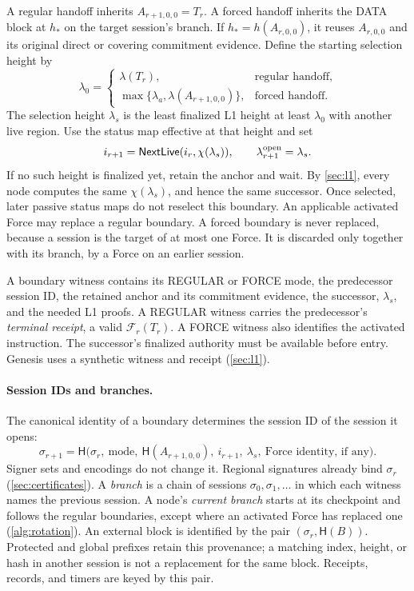 \documentclass[11pt,a4paper]{article}
\newif\ifrevmarks
\newcommand{\Rv}[1]{\ifrevmarks\leavevmode{\color{rvBlue}#1}\else#1\fi}
\newcommand{\Cid}[1]{\ifrevmarks\textsuperscript{\hyperlink{chg:#1}{\color{rvBlue}\sffamily\scriptsize#1}}\fi}
\newcommand{\FC}{\mathcal F}
\newcommand{\Hash}{\mathsf H}
\newcommand{\tagg}[1]{\ensuremath{\mathsf{#1}}}
\begin{document}
A regular handoff inherits $A_{r+1,0,0}=T_r$. A forced handoff inherits
the DATA block at $h_*$ on the target session's branch. If
$h_*=h(A_{r,0,0})$, it reuses $A_{r,0,0}$ and its original direct or covering commitment
evidence.
Define the starting selection height by
\[
 \lambda_0=\begin{cases}
 \lambda(T_r),&\text{regular handoff},\\
 \max\{\lambda_a,\lambda(A_{r+1,0,0})\},&\text{forced handoff}.
 \end{cases}
\]
The selection height $\lambda_s$ is the least finalized L1 height at
least $\lambda_0$ with another live region. Use the status map effective
at that height and set
\[
 i_{r+1}=\tagg{NextLive}(i_r,\chi(\lambda_s)),\qquad
 \lambda^{\rm open}_{r+1}=\lambda_s.
\]
If no such height is finalized yet, retain the anchor and wait.
\Rv{By \cref{sec:l1}, every node computes the same
$\chi(\lambda_s)$, and hence the same successor.} Once
selected, later passive status maps do not reselect this boundary.
An applicable activated Force may replace a regular boundary.
\Rv{A forced boundary is never replaced, because a session is
the target of at most one Force. It is discarded only together with its
branch, by a Force on an earlier session.}

A boundary witness contains its REGULAR or FORCE mode, the predecessor
\Rv{session ID}, the retained anchor and its commitment evidence, the successor,
$\lambda_s$, and the needed L1 proofs. \Rv{A REGULAR witness
carries the predecessor's \emph{terminal receipt}, a valid
$\FC_r(T_r)$.} A FORCE witness also identifies
the activated instruction. The successor's finalized authority must be
available before entry. Genesis uses a synthetic witness and receipt
\Rv{(\cref{sec:l1})}.

\paragraph{\Rv{Session IDs and branches.}}
\Rv{The canonical identity of a boundary determines the session
ID of the session it opens:}
\[
 \Rv{\sigma_{r+1}=\Hash\bigl(\sigma_r,\ \text{mode},\ \Hash(A_{r+1,0,0}),\
 i_{r+1},\ \lambda_s,\ \text{Force identity, if any}\bigr).}
\]
Signer sets and encodings do not change it. Regional signatures already
bind \Rv{$\sigma_r$ (\cref{sec:certificates}). \Cid{B2}A \emph{branch}
is a chain of sessions $\sigma_0,\sigma_1,\ldots$ in which each witness
names the previous session. A node's \emph{current branch} starts at its
checkpoint and follows the regular boundaries, except where an activated
Force has replaced one (\cref{alg:rotation}).} An external block is
identified by \Rv{the pair $(\sigma_r,\Hash(B))$}. Protected and global
prefixes retain this provenance; a matching \Rv{index,} height\Rv{,} or
hash \Rv{in} another \Rv{session} is not a replacement for the same block.
\Rv{Receipts, records, and timers are keyed by this pair.}
\end{document}
